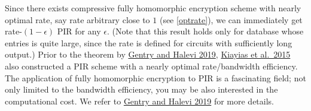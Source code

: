 Since there exists compressive fully homomorphic encryption scheme with
nearly optimal rate, say rate arbitrary close to \(1\) (see
\cref{optrate}), we can immediately get rate-\((1-\epsilon)\) PIR for
any \(\epsilon\). (Note that this result holds only for database whose
entries is quite large, since the rate is defined for circuits with
sufficiently long output.) Prior to the theorem by
\href{https://eprint.iacr.org/2019/733.pdf}{Gentry and Halevi 2019},
\href{https://petsymposium.org/2015/papers/23_Kiayias.pdf}{Kiayias et
al.~2015} also constructed a PIR scheme with a nearly optimal
rate/bandwidth efficiency. The application of fully homomorphic
encryption to PIR is a fascinating field; not only limited to the
bandwidth efficiency, you may be also interested in the computational
cost. We refer to \href{https://eprint.iacr.org/2019/733.pdf}{Gentry and
Halevi 2019} for more details.

